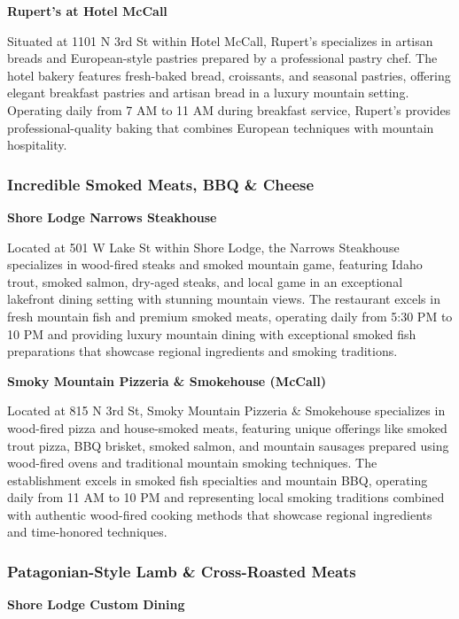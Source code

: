 \documentclass[
  11pt,
  letterpaper,
  DIV=10,
  numbers=noendperiod]{scrartcl}
\begin{document}
\textbf{Rupert's at Hotel McCall}

Situated at 1101 N 3rd St within Hotel McCall, Rupert's specializes in
artisan breads and European-style pastries prepared by a professional
pastry chef. The hotel bakery features fresh-baked bread, croissants,
and seasonal pastries, offering elegant breakfast pastries and artisan
bread in a luxury mountain setting. Operating daily from 7 AM to 11 AM
during breakfast service, Rupert's provides professional-quality baking
that combines European techniques with mountain hospitality.

\subsubsection{Incredible Smoked Meats, BBQ \&
Cheese}\label{incredible-smoked-meats-bbq-cheese-1}

\textbf{Shore Lodge Narrows Steakhouse}

Located at 501 W Lake St within Shore Lodge, the Narrows Steakhouse
specializes in wood-fired steaks and smoked mountain game, featuring
Idaho trout, smoked salmon, dry-aged steaks, and local game in an
exceptional lakefront dining setting with stunning mountain views. The
restaurant excels in fresh mountain fish and premium smoked meats,
operating daily from 5:30 PM to 10 PM and providing luxury mountain
dining with exceptional smoked fish preparations that showcase regional
ingredients and smoking traditions.

\textbf{Smoky Mountain Pizzeria \& Smokehouse (McCall)}

Located at 815 N 3rd St, Smoky Mountain Pizzeria \& Smokehouse
specializes in wood-fired pizza and house-smoked meats, featuring unique
offerings like smoked trout pizza, BBQ brisket, smoked salmon, and
mountain sausages prepared using wood-fired ovens and traditional
mountain smoking techniques. The establishment excels in smoked fish
specialties and mountain BBQ, operating daily from 11 AM to 10 PM and
representing local smoking traditions combined with authentic wood-fired
cooking methods that showcase regional ingredients and time-honored
techniques.

\subsubsection{Patagonian-Style Lamb \& Cross-Roasted
Meats}\label{patagonian-style-lamb-cross-roasted-meats-1}

\textbf{Shore Lodge Custom Dining}
\end{document}
